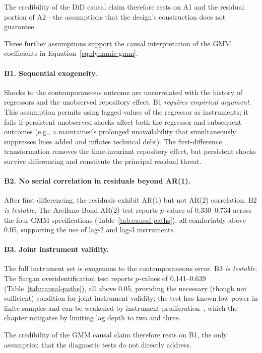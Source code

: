 The credibility of the DiD causal claim therefore rests on A1 and the residual portion of A2---the assumptions that the design's construction does not guarantee.

Three further assumptions support the causal interpretation of the GMM coefficients in Equation~\ref{eq:dynamic-gmm}.

\paragraph{B1. Sequential exogeneity.}
Shocks to the contemporaneous outcome are uncorrelated with the history of regressors and the unobserved repository effect.
B1 \emph{requires empirical argument}.
This assumption permits using lagged values of the regressor as instruments; it fails if persistent unobserved shocks affect both the regressor and subsequent outcomes (e.g., a maintainer's prolonged unavailability that simultaneously suppresses lines added and inflates technical debt).
The first-difference transformation removes the time-invariant repository effect, but persistent shocks survive differencing and constitute the principal residual threat.

\paragraph{B2. No serial correlation in residuals beyond AR(1).}
After first-differencing, the residuals exhibit AR(1) but not AR(2) correlation.
B2 \emph{is testable}.
The Arellano-Bond AR(2) test reports $p$-values of 0.330--0.734 across the four GMM specifications (Table~\ref{tab:causal-paths}), all comfortably above 0.05, supporting the use of lag-2 and lag-3 instruments.

\paragraph{B3. Joint instrument validity.}
The full instrument set is exogenous to the contemporaneous error.
B3 \emph{is testable}.
The Sargan overidentification test reports $p$-values of 0.141--0.639 (Table~\ref{tab:causal-paths}), all above 0.05, providing the necessary (though not sufficient) condition for joint instrument validity; the test has known low power in finite samples and can be weakened by instrument proliferation~\cite{arellano1991some}, which the chapter mitigates by limiting lag depth to two and three.

The credibility of the GMM causal claim therefore rests on B1, the only assumption that the diagnostic tests do not directly address.

